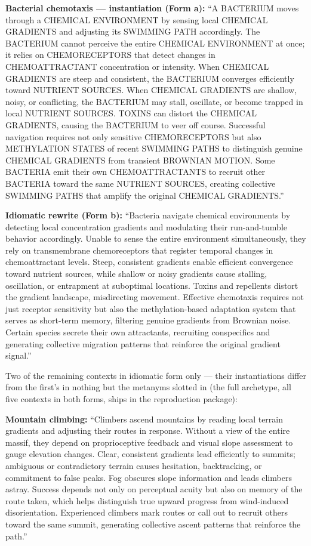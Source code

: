 \textbf{Bacterial chemotaxis --- instantiation (Form a):} ``A BACTERIUM moves through a CHEMICAL ENVIRONMENT by sensing local CHEMICAL GRADIENTS and adjusting its SWIMMING PATH accordingly. The BACTERIUM cannot perceive the entire CHEMICAL ENVIRONMENT at once; it relies on CHEMORECEPTORS that detect changes in CHEMOATTRACTANT concentration or intensity. When CHEMICAL GRADIENTS are steep and consistent, the BACTERIUM converges efficiently toward NUTRIENT SOURCES. When CHEMICAL GRADIENTS are shallow, noisy, or conflicting, the BACTERIUM may stall, oscillate, or become trapped in local NUTRIENT SOURCES. TOXINS can distort the CHEMICAL GRADIENTS, causing the BACTERIUM to veer off course. Successful navigation requires not only sensitive CHEMORECEPTORS but also METHYLATION STATES of recent SWIMMING PATHS to distinguish genuine CHEMICAL GRADIENTS from transient BROWNIAN MOTION. Some BACTERIA emit their own CHEMOATTRACTANTS to recruit other BACTERIA toward the same NUTRIENT SOURCES, creating collective SWIMMING PATHS that amplify the original CHEMICAL GRADIENTS.''

\textbf{Idiomatic rewrite (Form b):} ``Bacteria navigate chemical environments by detecting local concentration gradients and modulating their run-and-tumble behavior accordingly. Unable to sense the entire environment simultaneously, they rely on transmembrane chemoreceptors that register temporal changes in chemoattractant levels. Steep, consistent gradients enable efficient convergence toward nutrient sources, while shallow or noisy gradients cause stalling, oscillation, or entrapment at suboptimal locations. Toxins and repellents distort the gradient landscape, misdirecting movement. Effective chemotaxis requires not just receptor sensitivity but also the methylation-based adaptation system that serves as short-term memory, filtering genuine gradients from Brownian noise. Certain species secrete their own attractants, recruiting conspecifics and generating collective migration patterns that reinforce the original gradient signal.''

Two of the remaining contexts in idiomatic form only --- their instantiations differ from the first's in nothing but the metanyms slotted in (the full archetype, all five contexts in both forms, ships in the reproduction package):

\textbf{Mountain climbing:} ``Climbers ascend mountains by reading local terrain gradients and adjusting their routes in response. Without a view of the entire massif, they depend on proprioceptive feedback and visual slope assessment to gauge elevation changes. Clear, consistent gradients lead efficiently to summits; ambiguous or contradictory terrain causes hesitation, backtracking, or commitment to false peaks. Fog obscures slope information and leads climbers astray. Success depends not only on perceptual acuity but also on memory of the route taken, which helps distinguish true upward progress from wind-induced disorientation. Experienced climbers mark routes or call out to recruit others toward the same summit, generating collective ascent patterns that reinforce the path.''

